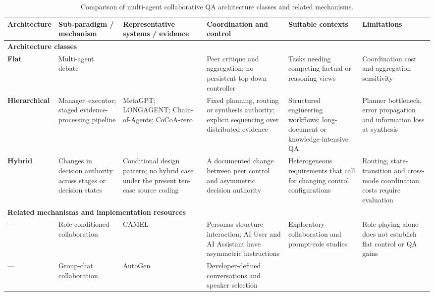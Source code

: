 \begin{table}[pos=t]
  \centering
  \caption{Comparison of multi-agent collaborative QA architecture classes and related mechanisms.}
  \label{tab:9categories}
  \scriptsize
  \begin{tabular}{p{1.4cm} p{2.0cm} p{2.4cm} p{3.2cm} p{2.3cm} p{2.2cm}}
    \toprule
    \textbf{Architecture} & \textbf{Sub-paradigm / mechanism} &
    \textbf{Representative systems / evidence} &
    \textbf{Coordination and control} &
    \textbf{Suitable contexts} & \textbf{Limitations} \\
    \midrule
    \multicolumn{6}{l}{\textbf{Architecture classes}} \\
    \midrule
    \textbf{Flat} & Multi-agent debate & \citet{du2024multiagent_debate} &
    Peer critique and aggregation; no persistent top-down controller &
    Tasks needing competing factual or reasoning views &
    Coordination cost and aggregation sensitivity \\
    \textbf{Hierarchical} & Manager--executor; staged evidence-processing pipeline &
    MetaGPT; LONGAGENT; Chain-of-Agents; CoCoA-zero
    \citep{hong2024metagpt,zhao2024longagent,zhang2024chain_agents,jiang2026cocoa} &
    Fixed planning, routing or synthesis authority; explicit sequencing over distributed evidence &
    Structured engineering workflows; long-document or knowledge-intensive QA &
    Planner bottleneck, error propagation and information loss at synthesis \\
    \textbf{Hybrid} & Changes in decision authority across stages or decision states &
    Conditional design pattern; no hybrid case under the present ten-case source coding &
    A documented change between peer control and asymmetric decision authority &
    Heterogeneous requirements that call for changing control configurations &
    Routing, state-transition and cross-mode coordination costs require evaluation \\
    \midrule
    \multicolumn{6}{l}{\textbf{Related mechanisms and implementation resources}} \\
    \midrule
    --- & Role-conditioned collaboration & CAMEL \citep{li2023camel} &
    Personas structure interaction; AI User and AI Assistant have asymmetric instructions &
    Exploratory collaboration and prompt-role studies &
    Role playing alone does not establish flat control or QA gains \\
    --- & Group-chat collaboration & AutoGen \citep{wu2024autogen} &
    Developer-defined conversations and speaker selection &

\end{tabular}
\end{table}

